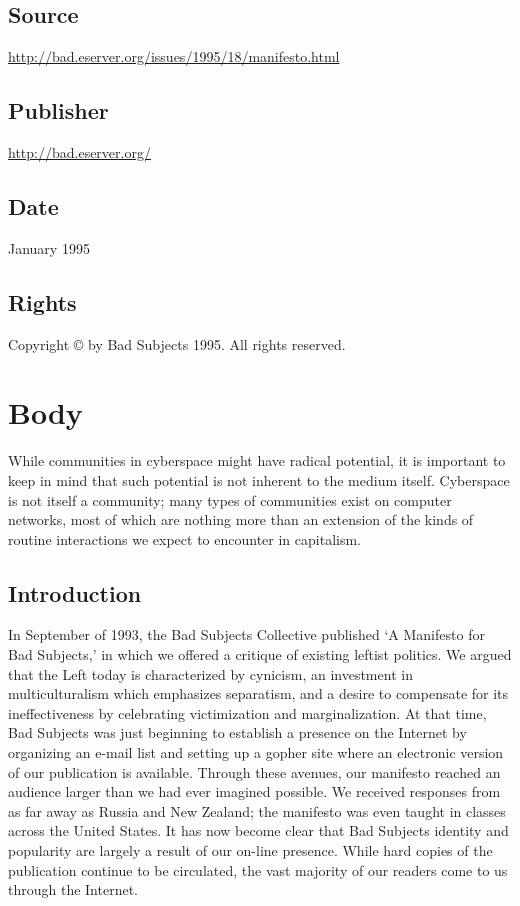 \documentclass[letterpaper,12pt,english]{sphinxmanual}
\begin{document}
\subsection{Source}
\label{1995:source}
\href{http://bad.eserver.org/issues/1995/18/manifesto.html}{http://bad.eserver.org/issues/1995/18/manifesto.html}


\subsection{Publisher}
\label{1995:publisher}
\href{http://bad.eserver.org/}{http://bad.eserver.org/}


\subsection{Date}
\label{1995:date}
January 1995


\subsection{Rights}
\label{1995:rights}
Copyright © by Bad Subjects 1995. All rights reserved.


\section{Body}
\label{1995:body}
While communities in cyberspace might have radical potential, it is important to keep in mind that such potential is not inherent to the medium itself. Cyberspace is not itself a community; many types of communities exist on computer networks, most of which are nothing more than an extension of the kinds of routine interactions we expect to encounter in capitalism.


\subsection{Introduction}
\label{1995:introduction}
In September of 1993, the Bad Subjects Collective published `A Manifesto for Bad Subjects,' in which we offered a critique of existing leftist politics. We argued that the Left today is characterized by cynicism, an investment in multiculturalism which emphasizes separatism, and a desire to compensate for its ineffectiveness by celebrating victimization and marginalization. At that time, Bad Subjects was just beginning to establish a presence on the Internet by organizing an e-mail list and setting up a gopher site where an electronic version of our publication is available. Through these avenues, our manifesto reached an audience larger than we had ever imagined possible. We received responses from as far away as Russia and New Zealand; the manifesto was even taught in classes across the United States. It has now become clear that Bad Subjects identity and popularity are largely a result of our on-line presence. While hard copies of the publication continue to be circulated, the vast majority of our readers come to us through the Internet.
\end{document}
